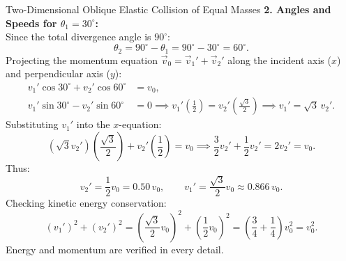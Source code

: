 \begin{workedexample}{Two-Dimensional Oblique Elastic Collision of Equal Masses}
\textbf{2. Angles and Speeds for $\theta_1 = 30^\circ$:}\\
Since the total divergence angle is $90^\circ$:
\[
\theta_2 = 90^\circ - \theta_1 = 90^\circ - 30^\circ = 60^\circ.
\]
Projecting the momentum equation $\vec{v}_0 = \vec{v}_1' + \vec{v}_2'$ along the incident axis ($x$) and perpendicular axis ($y$):
\begin{align*}
v_1' \cos 30^\circ + v_2' \cos 60^\circ &= v_0, \\
v_1' \sin 30^\circ - v_2' \sin 60^\circ &= 0 \implies v_1'\left(\frac{1}{2}\right) = v_2'\left(\frac{\sqrt{3}}{2}\right) \implies v_1' = \sqrt{3}\,v_2'.
\end{align*}
Substituting $v_1'$ into the $x$-equation:
\[
(\sqrt{3} v_2')\left(\frac{\sqrt{3}}{2}\right) + v_2'\left(\frac{1}{2}\right) = v_0 \implies \frac{3}{2}v_2' + \frac{1}{2}v_2' = 2v_2' = v_0.
\]
Thus:
\[
v_2' = \frac{1}{2} v_0 = 0.50\,v_0, \qquad v_1' = \frac{\sqrt{3}}{2} v_0 \approx 0.866\,v_0.
\]
Checking kinetic energy conservation:
\[
(v_1')^2 + (v_2')^2 = \left(\frac{\sqrt{3}}{2} v_0\right)^2 + \left(\frac{1}{2} v_0\right)^2 = \left(\frac{3}{4} + \frac{1}{4}\right)v_0^2 = v_0^2.
\]
Energy and momentum are verified in every detail.
\end{workedexample}
